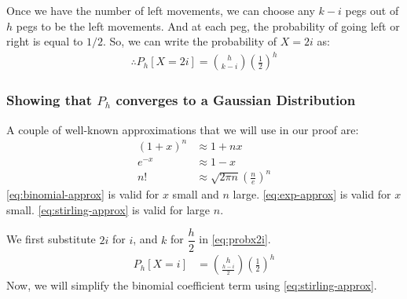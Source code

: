 Once we have the number of left movements, we can choose any $k-i$ pegs out of $h$ pegs to be the left movements.
And at each peg, the probability of going left or right is equal to $1/2$.
So, we can write the probability of $X=2i$ as:
\begin{align}
	\therefore P_h[X=2i] = \binom{h}{k-i} \left(\frac{1}{2}\right)^h \label{eq:probx2i}
\end{align}

\subsubsection*{Showing that $P_h$ converges to a Gaussian Distribution}
\begin{remark}
	A couple of well-known approximations that we will use in our proof are:
	\begin{align}
		(1+x)^n & \approx 1 + nx \label{eq:binomial-approx}                                   \\
		e^{-x}  & \approx 1 - x \label{eq:exp-approx}                                         \\
		n!      & \approx \sqrt{2\pi n} \left(\frac{n}{e}\right)^n \label{eq:stirling-approx}
	\end{align}
	\cref{eq:binomial-approx} is valid for $x$ small and $n$ large.
	\cref{eq:exp-approx} is valid for $x$ small.
	\cref{eq:stirling-approx} is valid for large $n$.
\end{remark}
We first substitute $2i$ for $i$, and $k$ for $\dfrac{h}{2}$ in \cref{eq:probx2i}.
\begin{align*}
	P_h[X=i] & = \binom{h}{\frac{h-i}{2}} \left(\frac{1}{2}\right)^h
\end{align*}
Now, we will simplify the binomial coefficient term using \cref{eq:stirling-approx}.

